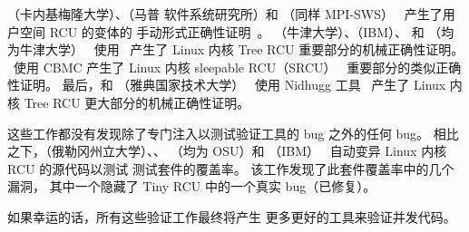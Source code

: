 （卡内基梅隆大学）、（马普
软件系统研究所）和
（同样 MPI-SWS）~\cite{JosephTassarotti2015RCUproof}
产生了用户空间 RCU 的变体的
手动形式正确性证明~\cite{MathieuDesnoyers2009URCU,MathieuDesnoyers2012URCU}。
（牛津大学）、（IBM）、
和
（均为牛津大学）~\cite{LihaoLiang2016VerifyTreeRCU}
使用~\cite{EdmundClarke2004CBMC}
产生了 Linux 内核 Tree RCU 重要部分的机械正确性证明。
~\cite{LanceRoy2017CBMC-SRCU}使用 CBMC 产生了
Linux 内核 sleepable RCU（SRCU）~\cite{PaulEMcKenney2006c}
重要部分的类似正确性证明。
最后，和
（雅典国家技术大学）~\cite{MichalisKokologiannakis2017NidhuggRCU,MichalisKokologiannakis2019RCUstatelessModelCheck}
使用 Nidhugg 工具~\cite{CarlLeonardsson2014Nidhugg}
产生了 Linux 内核 Tree RCU 更大部分的机械正确性证明。

这些工作都没有发现除了专门注入以测试验证工具的 bug 之外的任何 bug。
相比之下，（俄勒冈州立大学）、、
（均为 OSU）和
（IBM）~\cite{Groce:2015:VMC:2916135.2916190}
自动变异 Linux 内核 RCU 的源代码以测试
 测试套件的覆盖率。
该工作发现了此套件覆盖率中的几个漏洞，
其中一个隐藏了 Tiny RCU 中的一个真实 bug（已修复）。

如果幸运的话，所有这些验证工作最终将产生
更多更好的工具来验证并发代码。

